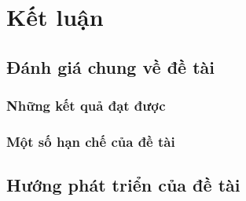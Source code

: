 \chapter{Kết luận }\label{chapter_conclusion}

\section{Đánh giá chung về đề tài}
\subsection{Những kết quả đạt được}
\subsection{Một số hạn chế của đề tài}
\section{Hướng phát triển của đề tài}